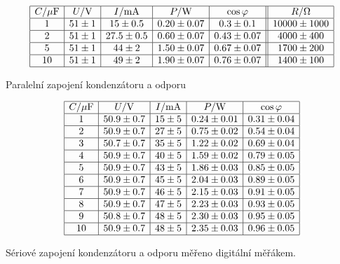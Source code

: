 \documentclass[a4paper,12pt]{article}
\begin{document}
\begin{table}
$$
\begin{array}{|c|c|c|c|c||c|}
\hline
C/\mu\mbox{F}&  U/\mbox{V}& I/\mbox{mA}&    P/\mbox{W}& \cos\varphi& R/\Omega \\ \hline
1&  51\pm1& 15\pm0.5& 0.20\pm0.07&    0.3\pm0.1&    10 000\pm 1000 \\ \hline
2&  51\pm1& 27.5\pm0.5& 0.60\pm 0.07&   0.43\pm0.07&    4000\pm 400 \\ \hline
5&  51\pm1& 44\pm2&    1.50\pm 0.07&   0.67\pm0.07& 1700\pm 200 \\ \hline
10& 51\pm1& 49\pm2&    1.90\pm 0.07&   0.76\pm0.07& 1400\pm 100 \\ \hline
\end{array}
$$
\caption{Paralelní zapojení kondenzátoru a odporu}
\label{RCp}
\end{table}

\begin{table}
$$
\begin{array}{|c|c|c|c|c|}
\hline
C/\mu\mbox{F}&  U/\mbox{V}& I/\mbox{mA}&    P/\mbox{W}& \cos\varphi \\ \hline
1&  50.9\pm0.7& 15\pm5& 0.24\pm0.01&    0.31\pm0.04 \\ \hline
2&  50.9\pm0.7& 27\pm5& 0.75\pm0.02&    0.54\pm0.04 \\ \hline
3&  50.7\pm0.7& 35\pm5& 1.22\pm0.02&    0.69\pm0.04 \\ \hline
4&  50.9\pm0.7& 40\pm5& 1.59\pm0.02&    0.79\pm0.05 \\ \hline
5&  50.9\pm0.7& 43\pm5& 1.86\pm0.03&    0.85\pm0.05 \\ \hline
6&  50.9\pm0.7& 45\pm5& 2.04\pm0.03&    0.89\pm0.05 \\ \hline
7&  50.9\pm0.7& 46\pm5& 2.15\pm0.03&    0.91\pm0.05 \\ \hline
8&  50.9\pm0.7& 47\pm5& 2.23\pm 0.03&   0.93\pm0.05 \\ \hline
9&  50.8\pm0.7& 48\pm5&    2.30\pm 0.03&   0.95\pm0.05 \\ \hline
10& 50.9\pm0.7& 48\pm5&    2.35\pm 0.03&   0.96\pm0.05 \\ \hline
\end{array}
$$
\caption{Sériové zapojení kondenzátoru a odporu měřeno digitální měřákem.}
\label{RCs2}
\end{table}
\end{document}
